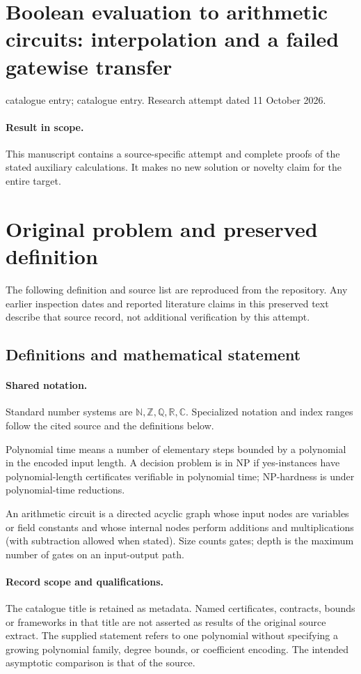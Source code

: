 \documentclass[11pt]{article}
\begin{document}
\section*{Boolean evaluation to arithmetic circuits: interpolation and a failed gatewise transfer}
\noindent catalogue entry; catalogue entry. Research attempt dated 11 October 2026.
\paragraph{Result in scope.}This manuscript contains a source-specific attempt and complete proofs of the stated auxiliary calculations. It makes no new solution or novelty claim for the entire target.
\section{Original problem and preserved definition}
The following definition and source list are reproduced from the repository. Any earlier inspection dates and reported literature claims in this preserved text describe that source record, not additional verification by this attempt.
\subsection{Definitions and mathematical statement}

\paragraph{Shared notation.}Standard number systems are $\mathbb N,\mathbb Z,\mathbb Q,\mathbb R,\mathbb C$. Specialized notation and index ranges follow the cited source and the definitions below.


Polynomial time means a number of elementary steps bounded by a polynomial in the encoded input length. A decision problem is in $\mathrm{NP}$ if yes-instances have polynomial-length certificates verifiable in polynomial time; NP-hardness is under polynomial-time reductions.

An arithmetic circuit is a directed acyclic graph whose input nodes are variables or field constants and whose internal nodes perform additions and multiplications (with subtraction allowed when stated). Size counts gates; depth is the maximum number of gates on an input-output path.
\paragraph{Record scope and qualifications.}
The catalogue title is retained as metadata. Named certificates, contracts, bounds or frameworks in that title are not asserted as results of the original source extract.
The supplied statement refers to one polynomial without specifying a growing polynomial family, degree bounds, or coefficient encoding. The intended asymptotic comparison is that of the source.
\end{document}
